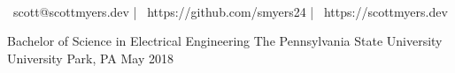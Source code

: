 \documentclass[]{awesome-cv}
\begin{document}
  
\begin{center}
	  \\
	\vspace{1mm}
	{\faEnvelope\ scott@scottmyers.dev} | {\faLink\ https://github.com/smyers24} | {\faLink\ https://scottmyers.dev}
\end{center}
\begin{cventries}
	\cventry
	{Bachelor of Science in Electrical Engineering}
	{The Pennsylvania State University}
	{University Park, PA}
	{May 2018}
	{}
\end{cventries}
\end{document}

